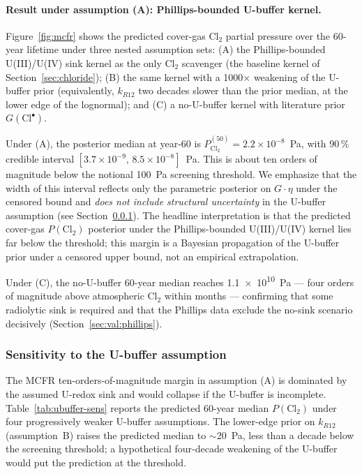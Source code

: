 \documentclass[11pt]{article}
\theoremstyle{plain}
\theoremstyle{definition}
\theoremstyle{remark}
\begin{document}
\paragraph{Result under assumption (A): Phillips-bounded U-buffer kernel.}
Figure~\ref{fig:mcfr} shows the predicted cover-gas Cl$_2$ partial pressure
over the 60-year lifetime under three nested assumption sets:
(A) the Phillips-bounded U(III)/U(IV) sink kernel as the only Cl$_2$
scavenger (the baseline kernel of Section~\ref{sec:chloride});
(B) the same kernel with a 1000$\times$ weakening of the U-buffer prior
(equivalently, $k_{R12}$ two decades slower than the prior median, at the
lower edge of the lognormal); and (C) a no-U-buffer kernel with literature
prior $G(\mathrm{Cl}^{\bullet})$.

Under (A), the posterior median at year-60 is
$P_{\mathrm{Cl_2}}^{(50)} = 2.2\times 10^{-8}$~Pa, with 90\,\% credible
interval $[3.7\times 10^{-9},\,8.5\times 10^{-8}]$~Pa.  This is about ten
orders of magnitude below the notional \SI{100}{\pascal} screening
threshold.  We emphasize that the width of this interval reflects only
the parametric posterior on $G\cdot\eta$ under the censored bound and
\emph{does not include structural uncertainty} in the U-buffer assumption
(see Section~\ref{sec:op:mcfr:ubuffer}).  The headline interpretation is
that the predicted cover-gas $P(\mathrm{Cl}_2)$ posterior under the
Phillips-bounded U(III)/U(IV) kernel lies far below the threshold; this
margin is a Bayesian propagation of the U-buffer prior under a censored
upper bound, not an empirical extrapolation.

Under (C), the no-U-buffer 60-year median reaches
\SI{1.1e10}{\pascal} — four orders of magnitude above atmospheric Cl$_2$
within months — confirming that some radiolytic sink is required and
that the Phillips data exclude the no-sink scenario decisively
(Section~\ref{sec:val:phillips}).

\subsubsection{Sensitivity to the U-buffer assumption}\label{sec:op:mcfr:ubuffer}

The MCFR ten-orders-of-magnitude margin in assumption (A) is dominated by
the assumed U-redox sink and would collapse if the U-buffer is incomplete.
Table~\ref{tab:ubuffer-sens} reports the predicted 60-year median
$P(\mathrm{Cl}_2)$ under four progressively weaker U-buffer assumptions.
The lower-edge prior on $k_{R12}$ (assumption~B) raises the predicted
median to $\sim$20~Pa, less than a decade below the screening threshold;
a hypothetical four-decade weakening of the U-buffer would put the
prediction at the threshold.
\end{document}
